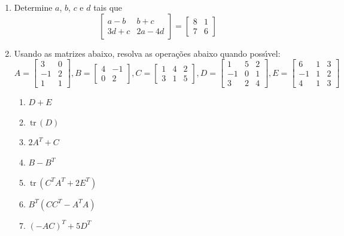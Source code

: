 \documentclass[a4paper,5pt]{amsbook}
\newcommand{\tr}{\,\mbox{tr}\,}
\begin{document}
\begin{enumerate}
	\item Determine $a$, $b$, $c$ e $d$ tais que
		\[\begin{bmatrix}
			a-b & b+c \\
			3d+c & 2a-4d
		\end{bmatrix}
		=
		\begin{bmatrix}
			8 & 1 \\
			7 & 6
		\end{bmatrix}\]

	\vspace{0.5cm}
	\item Usando as matrizes abaixo, resolva as opera\c{c}\~oes abaixo quando poss\'{\i}vel:
	\noindent{}
	\[A = \begin{bmatrix}
			3 & 0 \\
			-1 & 2 \\
			1 & 1
		\end{bmatrix},
	B = \begin{bmatrix}
			4 & -1 \\
			0 & 2
		\end{bmatrix},
	C = \begin{bmatrix}
			1 & 4 & 2 \\
			3 & 1 & 5
		\end{bmatrix},
	D = \begin{bmatrix}
			1 & 5 & 2 \\
			-1 & 0 & 1 \\
			3 & 2 & 4
		\end{bmatrix},
	E = \begin{bmatrix}
			6 & 1 & 3 \\
			-1 & 1 & 2 \\
			4 & 1 & 3
		\end{bmatrix}\]
		\begin{enumerate}
			\item $D+E$
			\item $\tr(D)$
			\item $2A^T+C$
			\item $B-B^T$
			\item $\tr(C^TA^T+2E^T)$
			\item $B^T(CC^T-A^TA)$
			\item $(-AC)^T+5D^T$
		\end{enumerate}



\end{enumerate}
\end{document}
